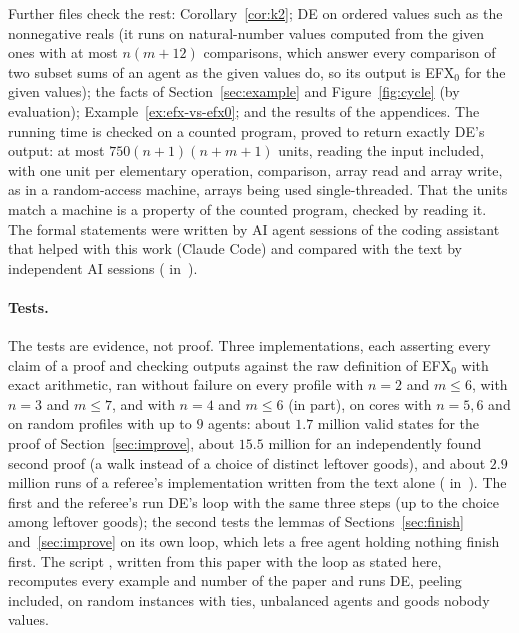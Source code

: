 \documentclass[runningheads,11pt]{llncs}
\newcommand{\efxz}{\texorpdfstring{\mbox{EFX$_0$}}{EFX0}}
\newcommand{\DE}{\textup{DE}}
\begin{document}
Further files check the rest: Corollary~\ref{cor:k2}; DE on ordered values such as the nonnegative reals (it runs on natural-number values computed from the given ones with at most $n(m+12)$ comparisons, which answer every comparison of two subset sums of an agent as the given values do, so its output is \efxz{} for the given values); the facts of Section~\ref{sec:example} and Figure~\ref{fig:cycle} (by evaluation); Example~\ref{ex:efx-vs-efx0}; and the results of the appendices. The running time is checked on a counted program, proved to return exactly \DE{}'s output: at most $750(n+1)(n+m+1)$ units, reading the input included, with one unit per elementary operation, comparison, array read and array write, as in a random-access machine, arrays being used single-threaded. That the units match a machine is a property of the counted program, checked by reading it. The formal statements were written by AI agent sessions of the coding assistant that helped with this work (Claude Code) and compared with the text by independent AI sessions ( in~\cite{Repo}).

\paragraph{Tests.} The tests are evidence, not proof. Three implementations, each asserting every claim of a proof and checking outputs against the raw definition of \efxz{} with exact arithmetic, ran without failure on every profile with $n=2$ and $m\le6$, with $n=3$ and $m\le7$, and with $n=4$ and $m\le6$ (in part), on cores with $n=5,6$ and on random profiles with up to $9$ agents: about $1.7$ million valid states for the proof of Section~\ref{sec:improve}, about $15.5$ million for an independently found second proof (a walk instead of a choice of distinct leftover goods), and about $2.9$ million runs of a referee's implementation written from the text alone ( in~\cite{Repo}). The first and the referee's run \DE{}'s loop with the same three steps (up to the choice among leftover goods); the second tests the lemmas of Sections~\ref{sec:finish} and~\ref{sec:improve} on its own loop, which lets a free agent holding nothing finish first. The script , written from this paper with the loop as stated here, recomputes every example and number of the paper and runs \DE{}, peeling included, on random instances with ties, unbalanced agents and goods nobody values.
\end{document}
